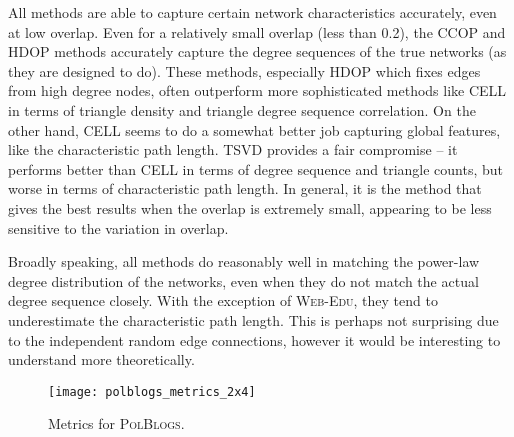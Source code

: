 All methods are able to capture certain network characteristics accurately, even at low overlap. 
Even for a relatively small overlap (less than 0.2), the CCOP  and HDOP methods accurately capture the degree sequences of the true networks
(as they are designed to do). %
These methods, especially HDOP which fixes edges from high degree nodes, often outperform more sophisticated methods like CELL in terms of triangle density and triangle degree sequence correlation. On the other hand, CELL seems to do a somewhat better job capturing global features, like
the characteristic path length. TSVD provides a fair compromise --  it performs better than CELL in terms
of degree sequence and triangle counts, but worse in terms of characteristic path length. In general, it is the method that gives the best results when the overlap is extremely small, appearing to be less sensitive to the variation in overlap.

Broadly speaking, all methods do reasonably well in matching the power-law  degree distribution of the networks, even when they do not match the actual degree sequence closely. With the exception of \textsc{Web-Edu}, they tend to underestimate the characteristic path length. This is perhaps not surprising due to the independent random edge connections, however it would be interesting to understand more theoretically. 

\begin{figure}
\centering
\texttt{[image: polblogs\_metrics\_2x4]}
\caption{Metrics for \textsc{PolBlogs}.}
\label{fig:polblogs_metrics}
\end{figure}


